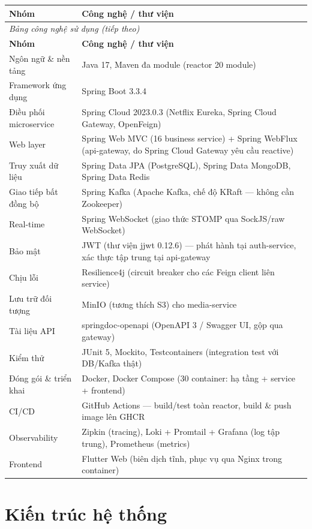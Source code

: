 \documentclass[12pt,a4paper]{report}
\newcommand{\twocolTableHeader}[3]{%
    \toprule
    \textbf{#2} & \textbf{#3} \\
    \midrule
    \endfirsthead
    \multicolumn{2}{l}{\small\itshape #1 (tiếp theo)} \\
    \toprule
    \textbf{#2} & \textbf{#3} \\
    \midrule
    \endhead
    \bottomrule
    \endfoot
}
\begin{document}
\begin{longtable}{p{4.2cm}p{10.8cm}}
\twocolTableHeader{Bảng công nghệ sử dụng}{Nhóm}{Công nghệ / thư viện}
Ngôn ngữ \& nền tảng & Java 17, Maven đa module (reactor 20 module) \\
Framework ứng dụng & Spring Boot 3.3.4 \\
Điều phối microservice & Spring Cloud 2023.0.3 (Netflix Eureka, Spring Cloud Gateway, OpenFeign) \\
Web layer & Spring Web MVC (16 business service) + Spring WebFlux (api-gateway, do Spring Cloud Gateway yêu cầu reactive) \\
Truy xuất dữ liệu & Spring Data JPA (PostgreSQL), Spring Data MongoDB, Spring Data Redis \\
Giao tiếp bất đồng bộ & Spring Kafka (Apache Kafka, chế độ KRaft — không cần Zookeeper) \\
Real-time & Spring WebSocket (giao thức STOMP qua SockJS/raw WebSocket) \\
Bảo mật & JWT (thư viện jjwt 0.12.6) — phát hành tại auth-service, xác thực tập trung tại api-gateway \\
Chịu lỗi & Resilience4j (circuit breaker cho các Feign client liên service) \\
Lưu trữ đối tượng & MinIO (tương thích S3) cho media-service \\
Tài liệu API & springdoc-openapi (OpenAPI 3 / Swagger UI, gộp qua gateway) \\
Kiểm thử & JUnit 5, Mockito, Testcontainers (integration test với DB/Kafka thật) \\
Đóng gói \& triển khai & Docker, Docker Compose (30 container: hạ tầng + service + frontend) \\
CI/CD & GitHub Actions — build/test toàn reactor, build \& push image lên GHCR \\
Observability & Zipkin (tracing), Loki + Promtail + Grafana (log tập trung), Prometheus (metrics) \\
Frontend & Flutter Web (biên dịch tĩnh, phục vụ qua Nginx trong container) \\
\end{longtable}

\chapter{Kiến trúc hệ thống}
\end{document}
